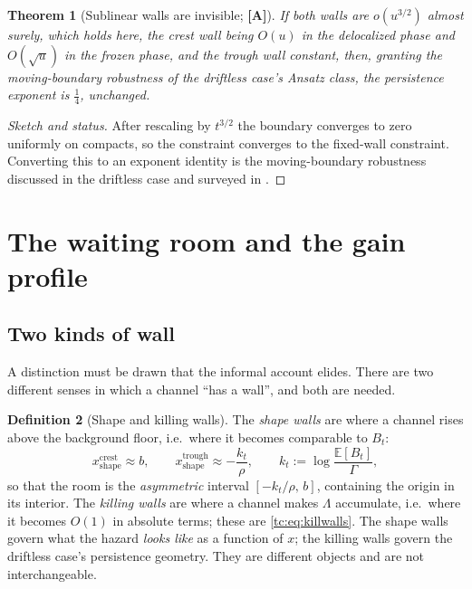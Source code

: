 \documentclass[11pt]{article}
\numberwithin{equation}{section}
\theoremstyle{plain}
\newtheorem{theorem}{Theorem}[section]
\theoremstyle{definition}
\newtheorem{definition}[theorem]{Definition}
\theoremstyle{remark}
\newcommand{\E}{\mathbb{E}}
\begin{document}
\begin{theorem}[Sublinear walls are invisible; \textbf{[A]}]
\label{tc:thm:sublinear}
If both walls are $o(u^{3/2})$ almost surely, which holds here, the
crest wall being $O(u)$ in the delocalized phase and $O(\sqrt u)$ in the
frozen phase, and the trough wall constant, then, granting the
moving-boundary robustness of the driftless case's Ansatz class, the
persistence exponent is $\tfrac14$, unchanged.
\end{theorem}

\begin{proof}[Sketch and status]
After rescaling by $t^{3/2}$ the boundary converges to zero uniformly on
compacts, so the constraint converges to the fixed-wall constraint.
Converting this to an exponent identity is the moving-boundary
robustness discussed in the driftless case and surveyed in \cite{AS15}.
\end{proof}

\section{The waiting room and the gain profile}\label{app:room}

\label{tc:sub:room}

\subsection{Two kinds of wall}\label{tc:subsub:twowalls}

A distinction must be drawn that the informal account elides. There are
two different senses in which a channel ``has a wall'', and both are
needed.

\begin{definition}[Shape and killing walls]\label{tc:def:walls}
The \emph{shape walls} are where a channel rises above the background
floor, i.e.\ where it becomes comparable to $B_t$:
\begin{equation}\label{tc:eq:shapewalls}
x^{\mathrm{crest}}_{\mathrm{shape}}\approx b,
\qquad
x^{\mathrm{trough}}_{\mathrm{shape}}\approx-\frac{k_t}{\rho},
\qquad
k_t:=\log\frac{\E[B_t]}{\Gamma},
\end{equation}
so that the room is the \emph{asymmetric} interval $[-k_t/\rho,\,b]$,
containing the origin in its interior.
The \emph{killing walls} are where a channel makes $\Lambda$ accumulate,
i.e.\ where it becomes $O(1)$ in absolute terms; these are
\eqref{tc:eq:killwalls}. The shape walls govern what the hazard
\emph{looks like} as a function of $x$; the killing walls govern
the driftless case's persistence geometry. They are different objects and are
not interchangeable.
\end{definition}
\end{document}
